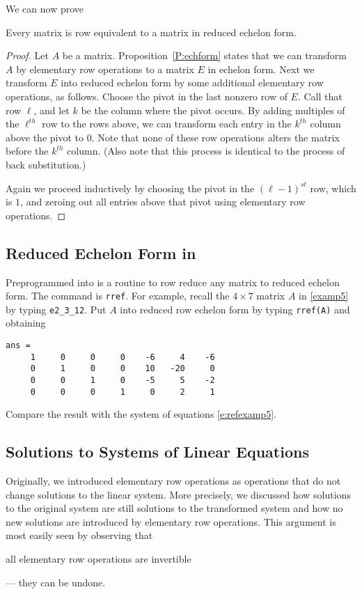 \documentclass{ximera}
\begin{document}
We can now prove
\begin{theorem}  \label{T:redechform}
Every matrix is row equivalent  to a matrix
in reduced echelon form.
\end{theorem}

\begin{proof} Let $A$ be a matrix.  Proposition~\ref{P:echform} states
that we can transform $A$ by elementary row operations to a matrix
$E$ in echelon form.  Next we transform $E$ into reduced echelon
form by some additional elementary row operations, as follows.
Choose the pivot in the last nonzero row of $E$.  Call that row
$\ell$, and let $k$ be the column where the pivot occurs.  By
adding multiples of the $\ell^{th}$ row to the rows above, we can
transform each entry in the $k^{th}$ column above the pivot to $0$.
Note that none of these row operations alters the matrix before
the $k^{th}$ column.  (Also note that this process is identical to
the process of back substitution.)

Again we proceed inductively by choosing the pivot in the
$(\ell-1)^{st}$ row, which is $1$, and zeroing out all entries
above that pivot using elementary row operations.  \end{proof}

\subsection*{Reduced Echelon Form in \Matlab}

Preprogrammed into \Matlab is a routine to row reduce any
matrix to reduced echelon form.  The command is
{\tt rref}.
For example, recall the $4\times 7$ matrix $A$ in \eqref{examp5}
by typing {\tt e2\_3\_12}.  Put $A$ into reduced row echelon
form by typing {\tt rref(A)} and obtaining
\begin{verbatim}
ans =
     1     0     0     0    -6     4    -6
     0     1     0     0    10   -20     0
     0     0     1     0    -5     5    -2
     0     0     0     1     0     2     1
\end{verbatim}
Compare the result with the system of equations \eqref{e:refexamp5}.

\subsection*{Solutions to Systems of Linear Equations}

Originally, we introduced elementary row
operations as operations that do not change solutions to the
linear system.  More precisely, we discussed how solutions to
the original system are still solutions to the transformed
system and how no new solutions are introduced by elementary
row operations.  This argument is most easily seen by observing
that
\begin{center}
all elementary row operations are invertible
\end{center}
--- they can be undone.
\end{document}
